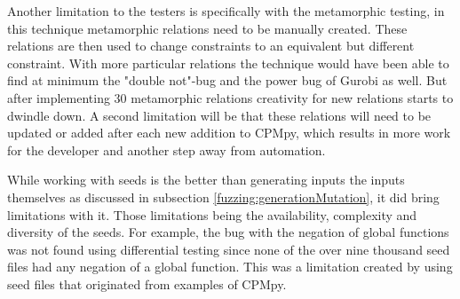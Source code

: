Another limitation to the testers is specifically with the metamorphic testing, in this technique metamorphic relations need to be manually created. These relations are then used to change constraints to an equivalent but different constraint. With more particular relations the technique would have been able to find at minimum the "double not"-bug and the power bug of Gurobi as well. But after implementing 30 metamorphic relations creativity for new relations starts to dwindle down. A second limitation will be that these relations will need to be updated or added after each new addition to CPMpy, which results in more work for the developer and another step away from automation.


While working with seeds is the better than generating inputs the inputs themselves as discussed in subsection \ref{fuzzing:generationMutation}, it did bring limitations with it. Those limitations being the availability, complexity and diversity of the seeds. For example, the bug with the negation of global functions was not found using differential testing since none of the over nine thousand seed files had any negation of a global function. This was a limitation created by using seed files that originated from examples of CPMpy.




